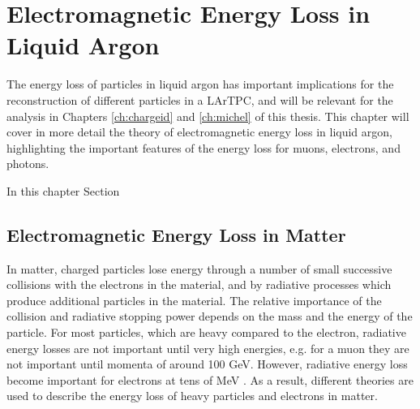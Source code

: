 \chapter{\label{ch:energyloss}Electromagnetic Energy Loss in Liquid Argon} 

% 

\minitoc

The energy loss of particles in liquid argon has important implications for the
reconstruction of different particles in a LArTPC, and will be relevant for the
analysis in Chapters \ref{ch:chargeid} and \ref{ch:michel} of  this thesis. This
chapter will cover in more detail the theory of electromagnetic energy loss in
liquid argon, highlighting the important features of the energy loss for 
muons, electrons, and photons.

In this chapter Section 

\section{Electromagnetic Energy Loss in Matter}
In matter, charged particles lose energy through a number of small successive
collisions with the electrons in the material, and by radiative processes which
produce additional particles in the material. The relative importance of the
collision and radiative stopping power depends on the mass and the energy of the
particle. For most particles, which are heavy compared to the electron, 
radiative energy losses are not important until very high energies, e.g. for a 
muon they are not important until momenta of around 100 GeV. However, 
radiative energy loss become important for electrons at tens of MeV 
\cite{PhysRevD.98.030001}. As a result, different theories are used to 
describe the energy loss of heavy particles and electrons in matter.

